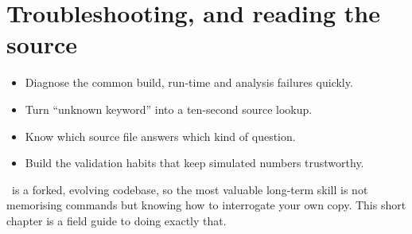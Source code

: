 \chapter{Troubleshooting, and reading the source}
\label{ch:trouble}

\begin{willdo}
\begin{itemize}
  \item Diagnose the common build, run-time and analysis failures quickly.
  \item Turn ``unknown keyword'' into a ten-second source lookup.
  \item Know which source file answers which kind of question.
  \item Build the validation habits that keep simulated numbers trustworthy.
\end{itemize}
\end{willdo}

\musrSim\ is a forked, evolving codebase, so the most valuable long-term skill is not memorising commands but knowing how to interrogate your own copy. This short chapter is a field guide to doing exactly that.


